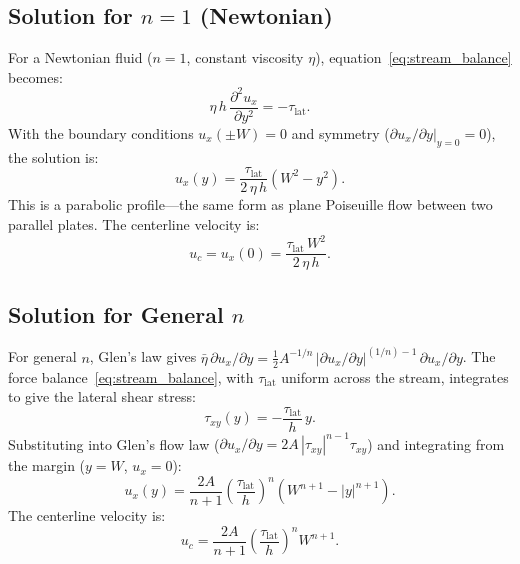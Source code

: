 \documentclass[11pt]{article}
\begin{document}

\subsection{Solution for $n = 1$ (Newtonian)}

For a Newtonian fluid ($n = 1$, constant viscosity $\eta$), equation~\eqref{eq:stream_balance} becomes:
\begin{equation}
  \eta\,h\,\frac{\partial^2 u_x}{\partial y^2} = -\tau_{\text{lat}}.
\end{equation}
With the boundary conditions $u_x(\pm W) = 0$ and symmetry ($\partial u_x/\partial y|_{y=0} = 0$), the solution is:
\begin{equation}
  u_x(y) = \frac{\tau_{\text{lat}}}{2\,\eta\,h}\left(W^2 - y^2\right).
  \label{eq:stream_newtonian}
\end{equation}
This is a parabolic profile---the same form as plane Poiseuille flow between two parallel plates.  The centerline velocity is:
\begin{equation}
  u_c = u_x(0) = \frac{\tau_{\text{lat}}\,W^2}{2\,\eta\,h}.
\end{equation}

\subsection{Solution for General $n$}

For general $n$, Glen's law gives $\bar{\eta}\,\partial u_x/\partial y = \frac{1}{2}A^{-1/n}\,|\partial u_x/\partial y|^{(1/n)-1}\,\partial u_x/\partial y$.  The force balance~\eqref{eq:stream_balance}, with $\tau_{\text{lat}}$ uniform across the stream, integrates to give the lateral shear stress:
\begin{equation}
  \tau_{xy}(y) = -\frac{\tau_{\text{lat}}}{h}\,y.
\end{equation}
Substituting into Glen's flow law ($\partial u_x/\partial y = 2A\,|\tau_{xy}|^{n-1}\tau_{xy}$) and integrating from the margin ($y = W$, $u_x = 0$):
\begin{equation}
  \boxed{u_x(y) = \frac{2A}{n+1}\left(\frac{\tau_{\text{lat}}}{h}\right)^n\!\left(W^{n+1} - |y|^{n+1}\right).}
  \label{eq:stream_glen}
\end{equation}
The centerline velocity is:
\begin{equation}
  u_c = \frac{2A}{n+1}\left(\frac{\tau_{\text{lat}}}{h}\right)^n W^{n+1}.
  \label{eq:stream_centerline}
\end{equation}
\end{document}
